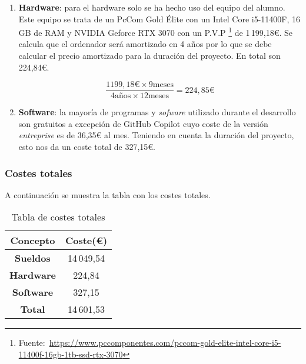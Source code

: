 \begin{enumerate}
Por otro lado el \textit{product owner}, suponiendo un sueldo bruto anual de 39\,000€\footnote{Fuente:~\url{https://www.glassdoor.es/Sueldos/product-owner-sueldo-SRCH_KO0,13.htm}} , se calcula que el salario bruto hora es de 
21,43€. Teniendo en cuenta que el tutor ha dedicado entorno a 3 horas por semana al proyecto, cobraría 257,16€ brutos al mes. Aplicando la formula al igual que para el desarrollador:
\begin{equation}
\frac{257,16\frac{\text{€}}{mes}}{\text{(1 - (0,236 + 0,067 + 0,002 + 0,006 + 0,015))}} = \text{381,54} \frac{\text{€}}{mes}
\end{equation}
Por lo tanto, y teniendo en cuenta que la duración del proyecto ha sido de 9 meses, el total que ha de pagar la empresa es de 14.049,54€ por los empleados.

\[
381.54\frac{\text{€}}{\text{mes}} \times 9\,\text{meses} + 1179.52\frac{\text{€}}{\text{mes}} \times 9\,\text{meses} = 14049.54\,\text{€}
\]


\item \textbf{Hardware}: para el hardware solo se ha hecho uso del equipo del alumno. Este equipo se trata de un PcCom Gold Élite con un Intel Core i5-11400F, 16 GB de RAM y NVIDIA Geforce RTX 3070 con un P.V.P \footnote{Fuente:~\url{https://www.pccomponentes.com/pccom-gold-elite-intel-core-i5-11400f-16gb-1tb-ssd-rtx-3070}} de 1\,199,18€. Se calcula que el ordenador será amortizado en 4 años por lo que se debe calcular el precio amortizado para la duración del proyecto. En total son 224,84€.

\[
\frac{1199,18\text{€}\times 9 \text{meses}}{4 \text{años} \times 12 \text{meses}}= 224,85\text{€}
\]

\item \textbf{Software}: la mayoría de programas y \textit{sofware} utilizado durante el desarrollo son gratuitos a excepción de GitHub Copilot cuyo coste de la versión \textit{entreprise} es de 36,35€ al mes. Teniendo en cuenta la duración del proyecto, esto nos da un coste total de 327,15€.

\end{enumerate}

\subsubsection{Costes totales}
A continuación se muestra la tabla con los costes totales.
\begin{table}[ht]
\begin{center}
\begin{tabular}{| c | c |}
	\hline
	\textbf{Concepto} & \textbf{Coste(€)} \\ \hline
	\textbf{Sueldos} & 14\,049,54 \\
	\textbf{Hardware} & 224,84 \\
	\textbf{Software} & 327,15 \\ \hline
	\hline
	\textbf{Total} & 14\,601,53 \\
	\hline
\end{tabular}
\caption{Tabla de costes totales}
\end{center}
\end{table}

